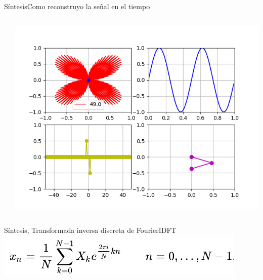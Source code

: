 \begin{frame}{Síntesis}{Como reconstruyo la señal en el tiempo}
   \handsonicon
   \begin{columns}[c]
      \hspace{2pt}
      \begin{column}{.5\textwidth}
         
      \end{column}
      \hspace{2pt}
      \vrule
      \hspace{2pt}
      \begin{column}{.4\textwidth}
         \centering\includegraphics[width=1.0\textwidth]{3_clase/euler6}
      \end{column}
      \hspace{2pt}
   \end{columns}
   \vfill
\end{frame}
 \begin{frame}{Síntesis, Transformada inversa discreta de Fourier}{IDFT}
    \center\includegraphics[width=0.9\textwidth]{3_clase/idft_eq}
    \vfill
 \end{frame}

